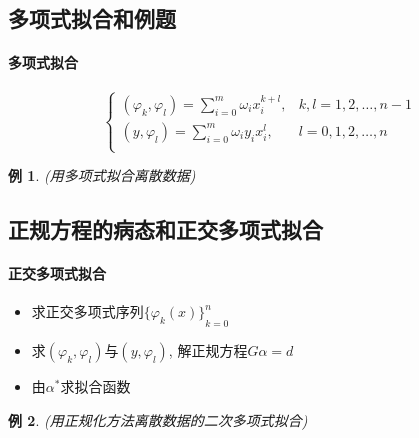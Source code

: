 \documentclass[twoside]{article}
\newtheorem{eg}{例}[section]
\begin{document}
\subsection{多项式拟合和例题}
\paragraph{多项式拟合}
\begin{equation}
  \begin{cases}{}
    (\varphi_k, \varphi_l) = \sum^m_{i=0} \omega_i x_i^{k+l}, & k,l=1,2,\ldots, n-1\\
    (y, \varphi_l) = \sum^m_{i=0} \omega_i y_i x_i^{l}, & l=0,1,2,\ldots, n\\
  \end{cases}
\end{equation}
\begin{eg}
  (用多项式拟合离散数据)
\end{eg}
\subsection{正规方程的病态和正交多项式拟合}
\paragraph{正交多项式拟合}
\begin{itemize}
  \item 求正交多项式序列${ \{\varphi_k(x)\} }^n_{k=0}$
  \item 求$(\varphi_k, \varphi_l)$与$(y, \varphi_l)$, 解正规方程$G\alpha=d$
  \item 由$\alpha^*$求拟合函数
\end{itemize}
\begin{eg}
  (用正规化方法离散数据的二次多项式拟合)
\end{eg}
\end{document}
